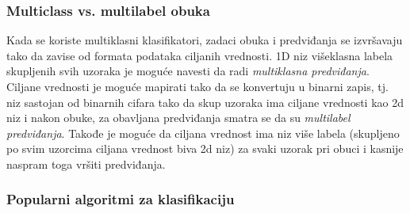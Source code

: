 \documentclass[fontsize=12bp, paper=a4]{scrarticle}
\begin{document}
\subsubsection{Multiclass vs. multilabel obuka}
Kada se koriste multiklasni klasifikatori, zadaci obuka i predviđanja se izvršavaju tako da zavise od formata podataka ciljanih vrednosti. 1D niz višeklasna labela skupljenih svih uzoraka je moguće navesti da radi \textit{multiklasna predviđanja}. Ciljane vrednosti je moguće mapirati tako da se konvertuju u binarni zapis, tj. niz sastojan od binarnih cifara tako da skup uzoraka ima ciljane vrednosti kao 2d niz i nakon obuke, za obavljana predviđanja smatra se da su \textit{multilabel predviđanja}. Takođe je moguće da ciljana vrednost ima niz više labela (skupljeno po svim uzorcima ciljana vrednost biva 2d niz) za svaki uzorak pri obuci i kasnije naspram toga vršiti predviđanja.


\subsubsection{Popularni algoritmi za klasifikaciju}
\justifying
\end{document}
